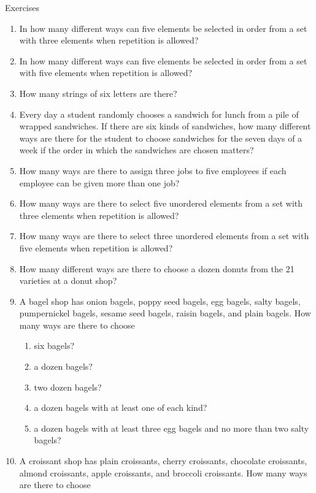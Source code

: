 \documentclass[11pt,a4paper]{book}
\begin{document}
Exercises
\begin{enumerate}
\item In how many different ways can five elements be selected in order from a set with three elements when repetition is allowed?
\item In how many different ways can five elements be selected in order from a set with five elements when repetition is allowed?
\item How many strings of six letters are there?
\item Every day a student randomly chooses a sandwich for lunch from a pile of wrapped sandwiches.
If there are six kinds of sandwiches, how many different ways are there for the student to choose sandwiches for the seven days of a week if the order in which the sandwiches are chosen matters?
\item How many ways are there to assign three jobs to five employees if each employee can be given more than one job?
\item How many ways are there to select five unordered elements from a set with three elements when repetition is allowed?
\item How many ways are there to select three unordered elements from a set with five elements when repetition is allowed?
\item How many different ways are there to choose a dozen donuts from the 21 varieties at a donut shop?
\item A bagel shop has onion bagels, poppy seed bagels, egg bagels, salty bagels, pumpernickel bagels, sesame seed bagels, raisin bagels, and plain bagels.
How many ways are there to choose
\begin{enumerate}[label=(\alph*)]
\item six bagels?
\item a dozen bagels?
\item two dozen bagels?
\item a dozen bagels with at least one of each kind?
\item a dozen bagels with at least three egg bagels and no more than two salty bagels?
\end{enumerate}
\item A croissant shop has plain croissants, cherry croissants, chocolate croissants, almond croissants, apple croissants, and broccoli croissants.
How many ways are there to choose
\begin{enumerate}[label=(\alph*)]

\end{enumerate}
\end{enumerate}
\end{document}
